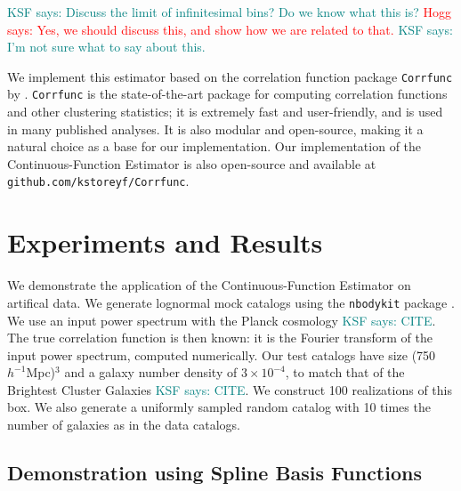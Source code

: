 \documentclass[modern]{aastex62}
\newcommand{\est}{the Continuous-Function Estimator\xspace}
\newcommand{\hmpc}{$h^{-1}$Mpc}
\newcommand{\KSF}[1]{\textcolor{teal}{KSF says: #1}}
\newcommand{\hogg}[1]{\textcolor{red}{Hogg says: #1}}
\begin{document}
\KSF{Discuss the limit of infinitesimal bins? Do we know what this is?} \hogg{Yes, we should discuss this, and show how we are related to that.} \KSF{I'm not sure what to say about this.}

We implement this estimator based on the correlation function package \texttt{Corrfunc} by \cite{Sinha2019}.
\texttt{Corrfunc} is the state-of-the-art package for computing correlation functions and other clustering statistics; it is extremely fast and user-friendly, and is used in many published analyses.
It is also modular and open-source, making it a natural choice as a base for our implementation.
Our implementation of \est is also open-source and available at \texttt{github.com/kstoreyf/Corrfunc}.


\section{Experiments and Results}
\label{sec:app}

We demonstrate the application of \est on artifical data.
We generate lognormal mock catalogs \citep{ColesJones1991} using the \texttt{nbodykit} package \citep{Hand2018}.
We use an input power spectrum with the Planck cosmology \KSF{CITE}.
The true correlation function is then known: it is the Fourier transform of the input power spectrum, computed numerically.
Our test catalogs have size (750 \hmpc)$^3$ and a galaxy number density of $3 \times 10^{-4}$, to match that of the Brightest Cluster Galaxies \KSF{CITE}.
We construct 100 realizations of this box. 
We also generate a uniformly sampled random catalog with 10 times the number of galaxies as in the data catalogs.

\subsection{Demonstration using Spline Basis Functions}
\label{sec:spline}
\end{document}
